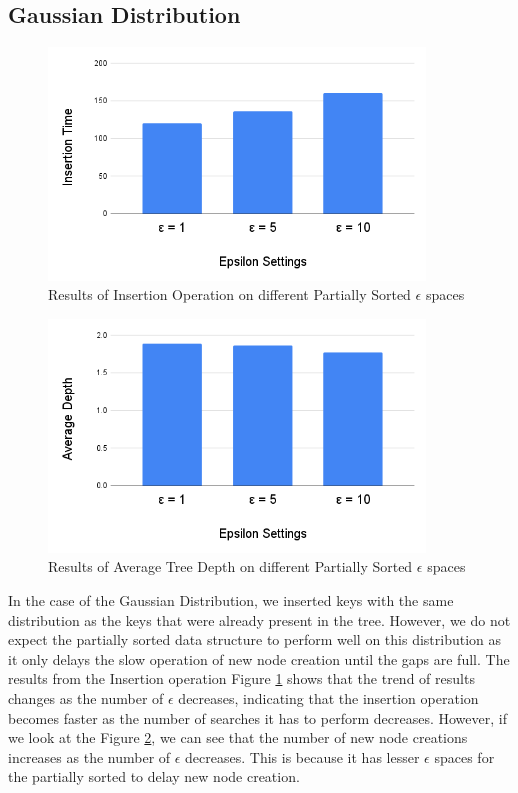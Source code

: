 \subsection{Gaussian Distribution}
\begin{figure}[H]
    \centering
    \includegraphics[width=100mm,scale=1]{Figures/InsertionGauEp.png}
    \caption{
     Results of Insertion Operation on different Partially Sorted $\epsilon$ spaces
    }
    \label{fig:InsertionGauEp}
\end{figure}
\begin{figure}[H]
    \centering
    \includegraphics[width=100mm,scale=1]{Figures/AvgTreeEpGau.png}
    \caption{
     Results of Average Tree Depth on different Partially Sorted $\epsilon$ spaces
    }
    \label{fig:AverageTreeDepthGauEp}
\end{figure}
In the case of the Gaussian Distribution, we inserted keys with the same distribution as the keys that were already present in the tree. However, we do not expect the partially sorted data structure to perform well on this distribution as it only delays the slow operation of new node creation until the gaps are full. The results from the Insertion operation Figure \ref{fig:InsertionGauEp} shows that the trend of results changes as the number of $\epsilon$ decreases, indicating that the insertion operation becomes faster as the number of searches it has to perform decreases. However, if we look at the Figure \ref{fig:AverageTreeDepthGauEp}, we can see that the number of new node creations increases as the number of $\epsilon$ decreases. This is because it has lesser $\epsilon$ spaces for the partially sorted to delay new node creation. 

